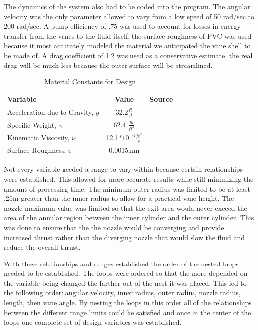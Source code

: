 \documentclass{report}
\begin{document}
The dynamics of the system also had to be coded into the program. The angular velocity was the only parameter allowed to vary from a low speed of 50 rad/sec to 200 rad/sec. A pump efficiency of .75 was used to account for losses in energy transfer from the vanes to the fluid itself, the surface roughness of PVC was used because it most accurately modeled the material we anticipated the vane shell to be made of. A drag coefficient of 1.2 was used as a conservative estimate, the real drag will be much less because the outer surface will be streamlined.\par
\begin{table}[h]
\begin{center}
\begin{tabular}{l|c|c}
Variable&Value& Source\\
\hline
Acceleration due to Gravity, $g$&32.2$\frac{ft}{s^2}$&\\
Specific Weight, $\gamma$&62.4 $\frac{lb}{ft^3}$&\\
Kinematic Viscosity, $\nu$&12.1$*10^{-6}\frac{ft^2}{s}$&\\
Surface Roughness, $\epsilon$&0.0015mm&\\
\hline 
\end{tabular}
\end{center}
\caption{Material Constants for Design}
\end{table}
Not every variable needed a range to vary within because certain relationships were established. This allowed for more accurate results while still minimizing the amount of processing time. The minimum outer radius was limited to be at least .25in greater than the inner radius to allow for a practical vane height. The nozzle maximum value was limited so that the exit area would never exceed the area of the annular region between the inner cylinder and the outer cylinder. This was done to ensure that the the nozzle would be converging and provide increased thrust rather than the diverging nozzle that would slow the fluid and reduce the overall thrust.  \par
With these relationships and ranges established the order of the nested loops needed to be established. The loops were ordered so that the more depended on the variable being changed the farther out of the nest it was placed. This led to the following order: angular velocity, inner radius, outer radius, nozzle radius, length, then vane angle. By nesting the loops in this order all of the relationships between the different range limits could be satisfied and once in the center of the loops one complete set of design variables was established.\par
\end{document}
